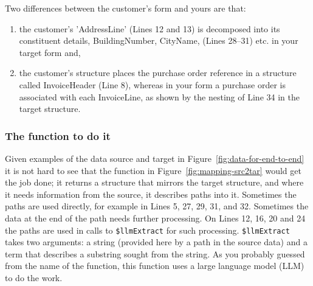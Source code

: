 \documentclass[10pt,letterpaper]{article} %
\newcommand{\stt}[1]{\texttt{#1}} %
\begin{document}
Two differences between the customer's form and yours are that:
\begin{enumerate}
\item{the customer's 'AddressLine' (Lines 12 and 13) is decomposed into its constituent details, BuildingNumber, CityName, (Lines 28--31) etc. in your target form and,}
\item{the customer's structure places the purchase order reference in a structure called InvoiceHeader (Line 8), whereas in your form a purchase order is associated with
each InvoiceLine, as shown by the nesting of Line 34 in the target structure.}
\end{enumerate}

\subsubsection{The function to do it}

Given examples of the data source and target in Figure~\ref{fig:data-for-end-to-end} it is not hard to see that the function in Figure~\ref{fig:mapping-src2tar} would get the job done;
it returns a structure that mirrors the target structure, and where it needs information from the source, it  describes paths into it.
Sometimes the paths are used directly, for example in Lines 5, 27, 29, 31, and 32.
Sometimes the data at the end of the path needs further processing.
On Lines 12, 16, 20 and 24 the paths are used in calls to  \stt{\$llmExtract} for such processing.
\stt{\$llmExtract} takes two arguments: a string (provided here by a path in the source data) and a term that describes a substring sought from the string.
As you probably guessed from the name of the function, this function uses a large language model (LLM) to do the work.
\end{document}
